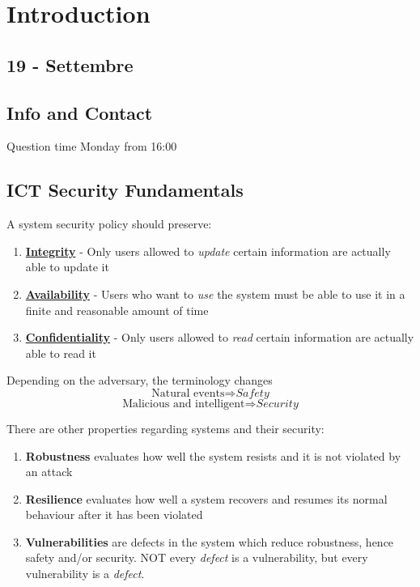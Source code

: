 \chapter{Introduction}
\section*{19 - Settembre}
\section{Info and Contact}


Question time Monday from 16:00

\section{ICT Security Fundamentals}
A system security policy should preserve:
\begin{enumerate}
    \item \textbf{\ul{Integrity}} - Only users allowed to \textit{update} certain information are actually able to update it
    \item \textbf{\ul{Availability}} - Users who want to \textit{use} the system must be able to use it in a finite and reasonable amount of time
    \item \textbf{\ul{Confidentiality}} - Only users allowed to \textit{read} certain information are actually able to read it
\end{enumerate}

Depending on the adversary, the terminology changes
\[\text{Natural events} \Rightarrow \textit{Safety}\]
\[\text{Malicious and intelligent} \Rightarrow \textit{Security}\]

There are other properties regarding systems and their security:
\begin{enumerate}
    \item \textbf{Robustness} evaluates how well the system resists and it is not violated by an attack
    \item \textbf{Resilience} evaluates how well a system recovers and resumes its normal behaviour after it has been violated
    \item \textbf{Vulnerabilities} are defects in the system which reduce robustness, hence safety and/or security. \nl
    NOT every \textit{defect} is a vulnerability,
    but every vulnerability is a \textit{defect}.
\end{enumerate}

